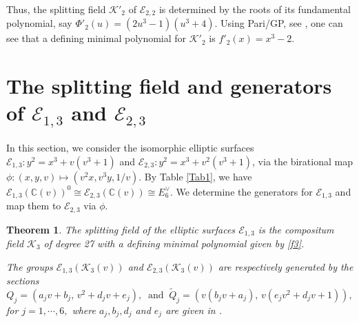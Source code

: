 \documentclass[11pt]{amsart}
\newcommand{\Q}{{\mathbb Q}}
\newcommand{\CC}{{\mathbb C}}
\newcommand{\Ee}{{\mathcal E}}
\newcommand{\KK}{{\mathcal K}}
\newtheorem{thm}{Theorem}[section]
\numberwithin{equation}{section}
\numberwithin{table}{section}
\newcommand\iso{\cong}
\newcommand\<{\langle}
\begin{document}
	Thus, the splitting field $\KK'_2$  of $\Ee_{2,2}$ is determined by the roots of its fundamental polynomial, say $\Phi'_{2}(u)= (2 u^3-1)(u^3+4)$. Using Pari/GP, see \cite[GP360]{Shioda360-Codes}, one can see that a defining minimal polynomial for  $\KK'_2$ is $f'_2(x)= x^3-2$.


\section{The splitting field and generators of $\Ee_{1, 3}$  and $\Ee_{2, 3}$}
\label{E6-(1,3)-(2,3)}
In this section, we  consider the isomorphic  elliptic surfaces   $\Ee_{1, 3}: y^2=x^3+v (v^3+1)$
and  $\Ee_{2, 3}: y^2=x^3+   v^2 (v^3+1)$, via the birational map 
$\phi: (x,y,v) \mapsto (v^2 x, v^3 y, 1/v)$.
 By Table \ref{Tab1}, we have   $\Ee_{1,3}(\CC(v))^0\iso \Ee_{2,3}(\CC(v))\iso E_6^\vee$.
 We determine the generators for $\mathcal{E}_{1,3}$ and map them to $\mathcal{E}_{2,3}$ via $\phi$.


\begin{thm}
	\label{main4}
	The splitting field of the elliptic  surfaces  $\Ee_{1, 3}$ is the compositum  field $\KK_3$ of 
	 degree 27 with a defining minimal polynomial given by \ref{f3}.

	The  groups $\Ee_{1, 3}(\KK_3(v))$ and $\Ee_{2,3}(\KK_3(v))$ are  respectively generated by the sections
	$$Q_j=\left(  a_j v +b_j, \, v^2 + d_j v +e_j\right),\
	\text{	and } \
	\widetilde{Q}_j=\left( v (b_j v + a_j), \, v (e_j v^2 + d_j v +1) \right),$$
	for $j=1,\cdots, 6,$ 	where 
	$a_j, b_j,  d_j$  and $e_j$ are given  in \cite[Points-3]{Shioda360-Codes}.
\end{thm}
\end{document}
